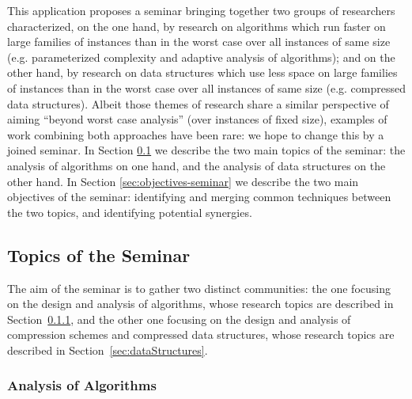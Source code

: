 \documentclass[a4paper,10pt]{article}
\begin{document}
This application proposes a seminar bringing together two groups of researchers characterized, on the one hand, by research on algorithms which run faster on large families of instances than in the worst case over all instances of same size  (e.g. parameterized complexity and adaptive analysis of algorithms); and on the other hand, by research on data structures which use less space on large families of instances than in the worst case over all instances of same size (e.g. compressed data structures). 
%
Albeit those themes of research share a similar perspective of aiming ``beyond worst case analysis'' (over instances of fixed size), examples of work combining both approaches have been rare: we hope to change this by a joined seminar.  
%
In Section \ref{sec:topics-seminar} we describe the two main topics of the seminar: the analysis of algorithms on one hand, and the analysis of data structures on the other hand. In Section \ref{sec:objectives-seminar} we describe the two main objectives of the seminar: identifying and merging common techniques between the two topics, and identifying potential synergies.


\subsection{Topics of the Seminar}
\label{sec:topics-seminar}

The aim of the seminar is to gather two distinct communities: the one focusing on the design and analysis of algorithms, whose research topics are described in Section~\ref{sec:algorithms}, and the other one focusing on the design and analysis of compression schemes and compressed data structures, whose research topics are described in Section~\ref{sec:dataStructures}.

\subsubsection{Analysis of Algorithms}
\label{sec:algorithms}
\end{document}
